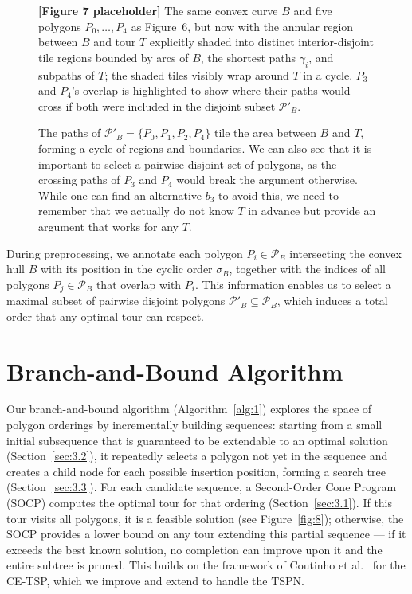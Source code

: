\documentclass[11pt,a4paper]{article}
\theoremstyle{plain}
\begin{document}
\begin{figure}[h]
\centering
\begin{figplaceholder}
\textbf{[Figure 7 placeholder]} The same convex curve $B$ and five polygons $P_0,\dots,P_4$ as Figure~6, but now with the annular region between $B$ and tour $T$ explicitly shaded into distinct interior-disjoint tile regions bounded by arcs of $B$, the shortest paths $\gamma_i$, and subpaths of $T$; the shaded tiles visibly wrap around $T$ in a cycle. $P_3$ and $P_4$'s overlap is highlighted to show where their paths would cross if both were included in the disjoint subset $\mathcal{P}'_B$.
\end{figplaceholder}
\caption{The paths of $\mathcal{P}'_B = \{P_0, P_1, P_2, P_4\}$ tile the area between $B$ and $T$, forming a cycle of regions and boundaries. We can also see that it is important to select a pairwise disjoint set of polygons, as the crossing paths of $P_3$ and $P_4$ would break the argument otherwise. While one can find an alternative $b_3$ to avoid this, we need to remember that we actually do not know $T$ in advance but provide an argument that works for any $T$.}
\label{fig:7}
\end{figure}

During preprocessing, we annotate each polygon $P_i \in \mathcal{P}_B$ intersecting the convex hull $B$ with its position in the cyclic order $\sigma_B$, together with the indices of all polygons $P_j \in \mathcal{P}_B$ that overlap with $P_i$. This information enables us to select a maximal subset of pairwise disjoint polygons $\mathcal{P}'_B \subseteq \mathcal{P}_B$, which induces a total order that any optimal tour can respect.

\section{Branch-and-Bound Algorithm}

Our branch-and-bound algorithm (Algorithm~\ref{alg:1}) explores the space of polygon orderings by incrementally building sequences: starting from a small initial subsequence that is guaranteed to be extendable to an optimal solution (Section~\ref{sec:3.2}), it repeatedly selects a polygon not yet in the sequence and creates a child node for each possible insertion position, forming a search tree (Section~\ref{sec:3.3}). For each candidate sequence, a Second-Order Cone Program (SOCP) computes the optimal tour for that ordering (Section~\ref{sec:3.1}). If this tour visits all polygons, it is a feasible solution (see Figure~\ref{fig:8}); otherwise, the SOCP provides a lower bound on any tour extending this partial sequence --- if it exceeds the best known solution, no completion can improve upon it and the entire subtree is pruned. This builds on the framework of Coutinho et al.~\cite{ref13} for the CE-TSP, which we improve and extend to handle the TSPN.
\end{document}
